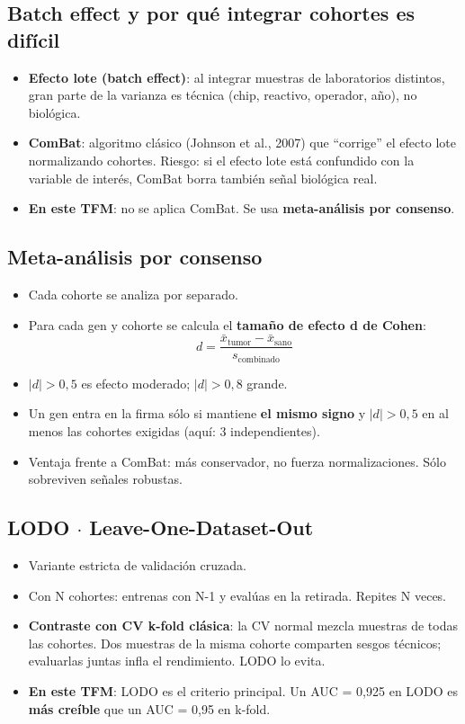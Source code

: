 \documentclass[11pt, a4paper]{article}
\begin{document}
\subsection{Batch effect y por qu\'e integrar cohortes es dif\'icil}

\begin{itemize}[leftmargin=1.2em, itemsep=2pt]
  \item \textbf{Efecto lote (batch effect)}: al integrar muestras de laboratorios distintos, gran parte de la varianza es t\'ecnica (chip, reactivo, operador, a\~no), no biol\'ogica.
  \item \textbf{ComBat}: algoritmo cl\'asico (Johnson et al., 2007) que ``corrige'' el efecto lote normalizando cohortes. Riesgo: si el efecto lote est\'a confundido con la variable de inter\'es, ComBat borra tambi\'en se\~nal biol\'ogica real.
  \item \textbf{En este TFM}: no se aplica ComBat. Se usa \textbf{meta-an\'alisis por consenso}.
\end{itemize}

\subsection{Meta-an\'alisis por consenso}

\begin{itemize}[leftmargin=1.2em, itemsep=2pt]
  \item Cada cohorte se analiza por separado.
  \item Para cada gen y cohorte se calcula el \textbf{tama\~no de efecto d de Cohen}:
  \[ d = \frac{\bar{x}_{\text{tumor}} - \bar{x}_{\text{sano}}}{s_{\text{combinado}}} \]
  \item $|d| > 0{,}5$ es efecto moderado; $|d| > 0{,}8$ grande.
  \item Un gen entra en la firma s\'olo si mantiene \textbf{el mismo signo} y $|d| > 0{,}5$ en al menos las cohortes exigidas (aqu\'i: 3 independientes).
  \item Ventaja frente a ComBat: m\'as conservador, no fuerza normalizaciones. S\'olo sobreviven se\~nales robustas.
\end{itemize}

\subsection{LODO $\cdot$ Leave-One-Dataset-Out}

\begin{itemize}[leftmargin=1.2em, itemsep=2pt]
  \item Variante estricta de validaci\'on cruzada.
  \item Con N cohortes: entrenas con N-1 y eval\'uas en la retirada. Repites N veces.
  \item \textbf{Contraste con CV k-fold cl\'asica}: la CV normal mezcla muestras de todas las cohortes. Dos muestras de la misma cohorte comparten sesgos t\'ecnicos; evaluarlas juntas infla el rendimiento. LODO lo evita.
  \item \textbf{En este TFM}: LODO es el criterio principal. Un AUC = 0,925 en LODO es \textbf{m\'as cre\'ible} que un AUC = 0,95 en k-fold.
\end{itemize}
\end{document}
